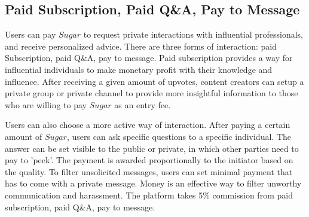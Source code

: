 \subsection{Paid Subscription, Paid Q\&A, Pay to Message}
Users can pay $Sugar$ to request private interactions with influential professionals, and receive personalized advice. There are three forms of interaction: paid Subscription, paid Q\&A, pay to message. 
Paid subscription provides a way for influential individuals to make monetary profit with their knowledge and influence. After receiving a given amount of upvotes, content creators can setup a private group or private channel to provide more insightful information to those who are willing to pay $Sugar$ as an entry fee. 
	
Users can also choose a more active way of interaction. After paying a certain amount of $Sugar$, users can ask specific questions to a specific individual. The answer can be set visible to the public or private, in which other parties need to pay to 'peek'. The payment is awarded proportionally to the initiator based on the quality.   							
To filter unsolicited messages, users can set minimal payment that has to come with a private message. Money is an effective way to filter unworthy communication and harassment. 
The platform takes 5\% commission from paid subscription, paid Q\&A, pay to message. 
